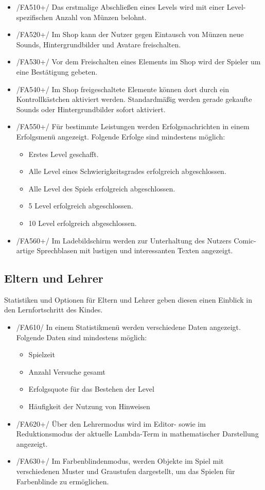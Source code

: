 \begin{itemize}
\item /FA510+/ Das erstmalige Abschließen eines Levels wird mit einer Level-spezifischen Anzahl von Münzen belohnt.
\item /FA520+/ Im Shop kann der Nutzer gegen Eintausch von Münzen neue Sounds, Hintergrundbilder und Avatare freischalten.
\item /FA530+/ Vor dem Freischalten eines Elements im Shop wird der Spieler um eine Bestätigung gebeten.
\item /FA540+/ Im Shop freigeschaltete Elemente können dort durch ein Kontrollkästchen aktiviert werden. Standardmäßig werden gerade gekaufte Sounds oder Hintergrundbilder sofort aktiviert.
\item /FA550+/ Für bestimmte Leistungen werden Erfolgsnachrichten in einem Erfolgsmenü angezeigt. Folgende Erfolge sind mindestens möglich:
\begin{itemize}
\item Erstes Level geschafft.
\item Alle Level eines Schwierigkeitsgrades erfolgreich abgeschlossen.
\item Alle Level des Spiels erfolgreich abgeschlossen.
\item 5 Level erfolgreich abgeschlossen.
\item 10 Level erfolgreich abgeschlossen.
\end{itemize}
\item /FA560+/ Im Ladebildschirm werden zur Unterhaltung des Nutzers Comic-artige Sprechblasen mit lustigen und interessanten Texten angezeigt.
\end{itemize}

\subsection{Eltern und Lehrer}

Statistiken und Optionen für Eltern und Lehrer geben diesen einen Einblick in den Lernfortschritt des Kindes.

\begin{itemize}
\item /FA610/ In einem Statistikmenü werden verschiedene Daten angezeigt. Folgende Daten sind mindestens möglich:
\begin{itemize}
\item Spielzeit
\item Anzahl Versuche gesamt
\item Erfolgsquote für das Bestehen der Level
\item Häufigkeit der Nutzung von Hinweisen
\end{itemize}
\item /FA620+/ Über den Lehrermodus wird im Editor- sowie im Reduktionsmodus der aktuelle Lambda-Term in mathematischer Darstellung angezeigt.
\item /FA630+/ Im Farbenblindenmodus, werden Objekte im Spiel mit verschiedenen Muster und Graustufen dargestellt, um das Spielen für Farbenblinde zu ermöglichen.
\end{itemize}

